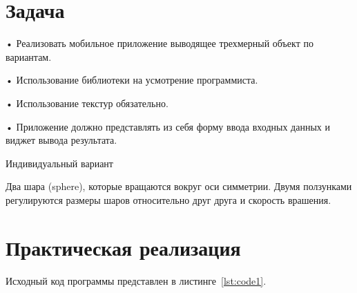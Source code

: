 \documentclass[a4paper, 14pt]{extarticle}
\begin{document}
\renewcommand{\ttdefault}{pcr}

\setlength{\tabcolsep}{3pt}
\newpage
\setcounter{page}{2}

\section{Задача}\label{Sect::task}

• Реализовать  мобильное приложение выводящее трехмерный объект по вариантам.

• Использование библиотеки на усмотрение программиста.

• Использование текстур обязательно.

• Приложение должно представлять из себя форму ввода входных данных и виджет вывода результата.

Индивидуальный вариант

Два шара (sphere), которые вращаются вокруг оси симметрии. Двумя ползунками регулируются размеры шаров относительно друг друга и скорость врашения.

\section{Практическая реализация}\label{Sect::code}

Исходный код программы представлен в листинге~\ref{lst:code1}.  
\end{document}

